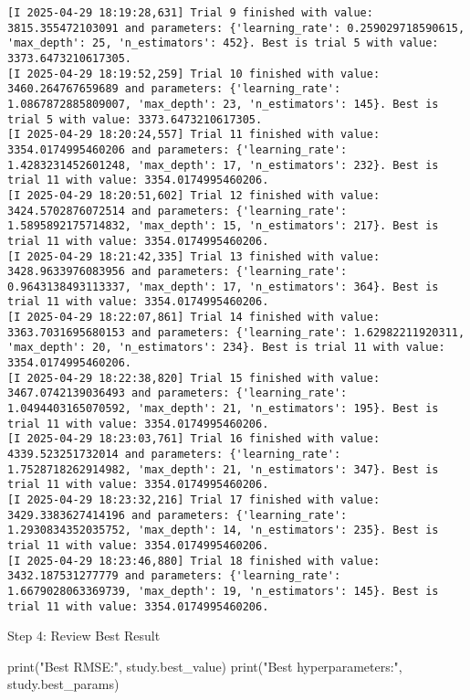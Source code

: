 \documentclass[
  letterpaper,
  DIV=11,
  numbers=noendperiod]{scrreprt}
\newenvironment{Shaded}{\begin{snugshade}}{\end{snugshade}}
\newcommand{\BuiltInTok}[1]{\textcolor[rgb]{0.00,0.23,0.31}{#1}}
\newcommand{\NormalTok}[1]{\textcolor[rgb]{0.00,0.23,0.31}{#1}}
\newcommand{\StringTok}[1]{\textcolor[rgb]{0.13,0.47,0.30}{#1}}
\begin{document}
\begin{verbatim}
[I 2025-04-29 18:19:28,631] Trial 9 finished with value: 3815.355472103091 and parameters: {'learning_rate': 0.259029718590615, 'max_depth': 25, 'n_estimators': 452}. Best is trial 5 with value: 3373.6473210617305.
[I 2025-04-29 18:19:52,259] Trial 10 finished with value: 3460.264767659689 and parameters: {'learning_rate': 1.0867872885809007, 'max_depth': 23, 'n_estimators': 145}. Best is trial 5 with value: 3373.6473210617305.
[I 2025-04-29 18:20:24,557] Trial 11 finished with value: 3354.0174995460206 and parameters: {'learning_rate': 1.4283231452601248, 'max_depth': 17, 'n_estimators': 232}. Best is trial 11 with value: 3354.0174995460206.
[I 2025-04-29 18:20:51,602] Trial 12 finished with value: 3424.5702876072514 and parameters: {'learning_rate': 1.5895892175714832, 'max_depth': 15, 'n_estimators': 217}. Best is trial 11 with value: 3354.0174995460206.
[I 2025-04-29 18:21:42,335] Trial 13 finished with value: 3428.9633976083956 and parameters: {'learning_rate': 0.9643138493113337, 'max_depth': 17, 'n_estimators': 364}. Best is trial 11 with value: 3354.0174995460206.
[I 2025-04-29 18:22:07,861] Trial 14 finished with value: 3363.7031695680153 and parameters: {'learning_rate': 1.62982211920311, 'max_depth': 20, 'n_estimators': 234}. Best is trial 11 with value: 3354.0174995460206.
[I 2025-04-29 18:22:38,820] Trial 15 finished with value: 3467.0742139036493 and parameters: {'learning_rate': 1.0494403165070592, 'max_depth': 21, 'n_estimators': 195}. Best is trial 11 with value: 3354.0174995460206.
[I 2025-04-29 18:23:03,761] Trial 16 finished with value: 4339.523251732014 and parameters: {'learning_rate': 1.7528718262914982, 'max_depth': 21, 'n_estimators': 347}. Best is trial 11 with value: 3354.0174995460206.
[I 2025-04-29 18:23:32,216] Trial 17 finished with value: 3429.3383627414196 and parameters: {'learning_rate': 1.2930834352035752, 'max_depth': 14, 'n_estimators': 235}. Best is trial 11 with value: 3354.0174995460206.
[I 2025-04-29 18:23:46,880] Trial 18 finished with value: 3432.187531277779 and parameters: {'learning_rate': 1.6679028063369739, 'max_depth': 19, 'n_estimators': 145}. Best is trial 11 with value: 3354.0174995460206.
\end{verbatim}

Step 4: Review Best Result

\begin{Shaded}
\begin{Highlighting}[]
\BuiltInTok{print}\NormalTok{(}\StringTok{"Best RMSE:"}\NormalTok{, study.best\_value)}
\BuiltInTok{print}\NormalTok{(}\StringTok{"Best hyperparameters:"}\NormalTok{, study.best\_params)}
\end{Highlighting}
\end{Shaded}
\end{document}
